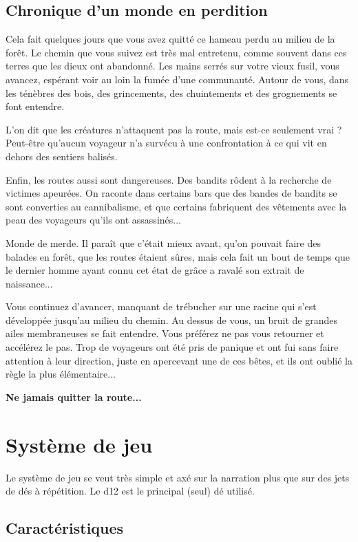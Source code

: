 \documentclass[a4paper,10pt,twoside,twocolumn,openany,bg=print,justified]{dndbook}
\begin{document}
\section*{Chronique d'un monde en perdition}

Cela fait quelques jours que vous avez quitté ce hameau perdu au milieu de la forêt. Le chemin que vous suivez est très mal entretenu, comme souvent dans ces terres que les dieux ont abandonné. Les mains serrés sur votre vieux fusil, vous avancez, espérant voir au loin la fumée d'une communauté. Autour de vous, dans les ténèbres des bois, des grincements, des chuintements et des grognements se font entendre.

L'on dit que les créatures n'attaquent pas la route, mais est-ce seulement vrai ? Peut-être qu'aucun voyageur n'a survécu à une confrontation à ce qui vit en dehors des sentiers balisés.

Enfin, les routes aussi sont dangereuses. Des bandits rôdent à la recherche de victimes apeurées. On raconte dans certains bars que des bandes de bandits se sont converties au cannibalisme, et que certains fabriquent des vêtements avec la peau des voyageurs qu'ils ont assassinés...

Monde de merde. Il paraît que c'était mieux avant, qu'on pouvait faire des balades en forêt, que les routes étaient sûres, mais cela fait un bout de temps que le dernier homme ayant connu cet état de grâce a ravalé son extrait de naissance...

Vous continuez d'avancer, manquant de trébucher sur une racine qui s'est développée jusqu'au milieu du chemin. Au dessus de vous, un bruit de grandes ailes membraneuses se fait entendre. Vous préférez ne pas vous retourner et accélérez le pas. Trop de voyageurs ont été pris de panique et ont fui sans faire attention à leur direction, juste en apercevant une de ces bêtes, et ils ont oublié la règle la plus élémentaire...

\textbf{Ne jamais quitter la route...}

\tableofcontents

\chapter{Système de jeu}

Le système de jeu se veut très simple et axé sur la narration plus que sur des jets de dés à répétition. Le d12 est le principal (seul) dé utilisé. 

\section{Caractéristiques}
\end{document}
